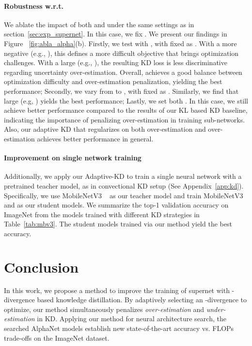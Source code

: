 \documentclass{article}
\begin{document}
\paragraph{Robustness w.r.t. }
We ablate the impact of both  and  under the same settings as in section~\ref{sec:exp_supernet}.
In this case,  we fix .
We present our findings in Figure~ \ref{fig:abla_alpha}(b). 
Firstly,  we test with , with  fixed as . 
With a more negative  (e.g., ), this defines a more difficult objective that brings optimization challenges. With a large  (e.g., ), the resulting KD loss is less discriminative regarding {uncertainty over-estimation}. Overall,  achieves a good balance between optimization difficulty and over-estimation penalization, yielding the best performance; 
Secondly, we vary  from  to , with  fixed as . 
Similarly, we find that large  (e.g, ) yields the best performance; 
Lastly, we set both . In this case, 
we still achieve better performance compared to the results of our KL based KD baseline, indicating the importance of penalizing over-estimation in training sub-networks. 
Also, our adaptive KD that regularizes on both over-estimation and over-estimation achieves better performance in general. 



\paragraph{Improvement on single network training}
Additionally, we apply our Adaptive-KD to train 
a single neural network with a pretrained teacher model, 
as in convectional KD setup (See Appendix~\ref{app:kd}). 
Specifically, 
we use MobileNetV3 ~\citep{howard2019searching} as our teacher model and 
train MobileNetV3  and   as our student models.  
We summarize the top-1 validation accuracy  on ImageNet from the models trained with different KD strategies in Table~\ref{tab:mbv3}. 
The student models trained via our method yield the best accuracy.   

 

\section{Conclusion}
In this work, we propose a method to improve the training of supernet with -divergence based knowledge distillation. 
By adaptively selecting an -divergence to optimize, 
our method simultaneously penalizes \emph{over-estimation} and \emph{under-estimation} in KD. 
Applying our method for neural architecture search, the searched AlphaNet models establish new state-of-the-art accuracy vs. FLOPs trade-offs on the ImageNet dataset.
 
\end{document}
